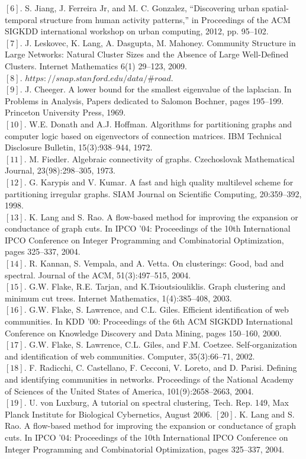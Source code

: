\documentclass[12pt]{article}
\begin{document}
$[6]$. S. Jiang, J. Ferreira Jr, and M. C. Gonzalez, “Discovering urban spatial-temporal structure from human activity patterns,” in Proceedings of the ACM SIGKDD international workshop on urban computing, 2012, pp. 95–102.\\
$[7]$. J. Leskovec, K. Lang, A. Dasgupta, M. Mahoney. Community Structure in Large Networks: Natural Cluster Sizes and the Absence of Large Well-Defined Clusters. Internet Mathematics 6(1) 29--123, 2009.\\
$[8]$. $https://snap.stanford.edu/data/\#road$.\\
$[9]$. J. Cheeger. A lower bound for the smallest eigenvalue of the laplacian. In Problems in Analysis, Papers dedicated to Salomon Bochner, pages 195–199. Princeton University Press, 1969.\\
$[10]$. W.E. Donath and A.J. Hoffman. Algorithms for partitioning graphs and computer logic based on eigenvectors of connection matrices. IBM Technical Disclosure Bulletin, 15(3):938–944, 1972.\\
$[11]$. M. Fiedler. Algebraic connectivity of graphs. Czechoslovak Mathematical Journal, 23(98):298–305, 1973.\\
$[12]$. G. Karypis and V. Kumar. A fast and high quality multilevel scheme for partitioning irregular graphs. SIAM Journal on Scientific Computing, 20:359–392, 1998.\\
$[13]$. K. Lang and S. Rao. A flow-based method for improving the expansion or conductance of graph cuts. In IPCO ’04: Proceedings of the 10th International IPCO Conference on Integer Programming and Combinatorial Optimization, pages 325–337, 2004.\\
$[14]$. R. Kannan, S. Vempala, and A. Vetta. On clusterings: Good, bad and spectral. Journal of the ACM, 51(3):497–515, 2004.\\
$[15]$. G.W. Flake, R.E. Tarjan, and K.Tsioutsiouliklis. Graph clustering and minimum cut trees. Internet Mathematics, 1(4):385–408, 2003.\\
$[16]$. G.W. Flake, S. Lawrence, and C.L. Giles. Efficient identification of web communities. In KDD ’00: Proceedings of the 6th ACM SIGKDD International Conference on Knowledge Discovery and Data Mining, pages 150–160, 2000.\\
$[17]$. G.W. Flake, S. Lawrence, C.L. Giles, and F.M. Coetzee. Self-organization and identification of web communities. Computer, 35(3):66–71, 2002.\\
$[18]$. F. Radicchi, C. Castellano, F. Cecconi, V. Loreto, and D. Parisi. Defining and identifying communities in networks. Proceedings of the National Academy of Sciences of the United States of America, 101(9):2658–2663, 2004.\\
$[19]$. U. von Luxburg, A tutorial on spectral clustering, Tech. Rep. 149, Max Planck Institute for Biological Cybernetics, August 2006.
$[20]$. K. Lang and S. Rao. A flow-based method for improving the expansion or conductance of graph cuts. In IPCO ’04: Proceedings of the 10th International IPCO Conference on Integer Programming and Combinatorial Optimization, pages 325–337, 2004.
\end{document}
